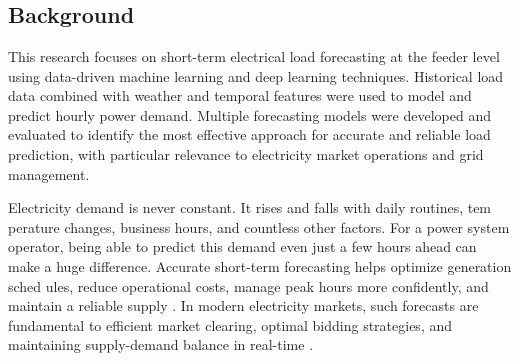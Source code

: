 \documentclass[oneside, 12pt]{book}
\numberwithin{equation}{chapter}
\newcommand{\sizexii}{\fontsize{12pt}{6pt}\selectfont}
\begin{document}

\clearpage
{}




\chapter*{\vspace{-1in}\centering {\sizexii  CHAPTER ONE: INTRODUCTION}}
\setcounter{chapter}{1}
\setcounter{section}{0}
\setcounter{equation}{0}
\setcounter{figure}{0}
\setcounter{table}{0}
\vspace{-12pt}

\section{\sizexii Background}
This research focuses on short-term electrical load forecasting at the feeder level
using data-driven machine learning and deep learning techniques. Historical load
data combined with weather and temporal features were used to model and predict
hourly power demand. Multiple forecasting models were developed and evaluated to
identify the most effective approach for accurate and reliable load prediction, with particular relevance to electricity market operations and grid management.

Electricity demand is never constant. It rises and falls with daily routines, tem
perature changes, business hours, and countless other factors. For a power system
operator, being able to predict this demand even just a few hours ahead can make
a huge difference. Accurate short-term forecasting helps optimize generation sched
ules, reduce operational costs, manage peak hours more confidently, and maintain a
reliable supply \parencite{aguilar2021short, chapagain2021short}. In modern electricity markets, such forecasts are fundamental to efficient market clearing, optimal bidding strategies, and maintaining supply-demand balance in real-time \parencite{weron2014electricity, kirschen2018fundamentals}.
\end{document}

